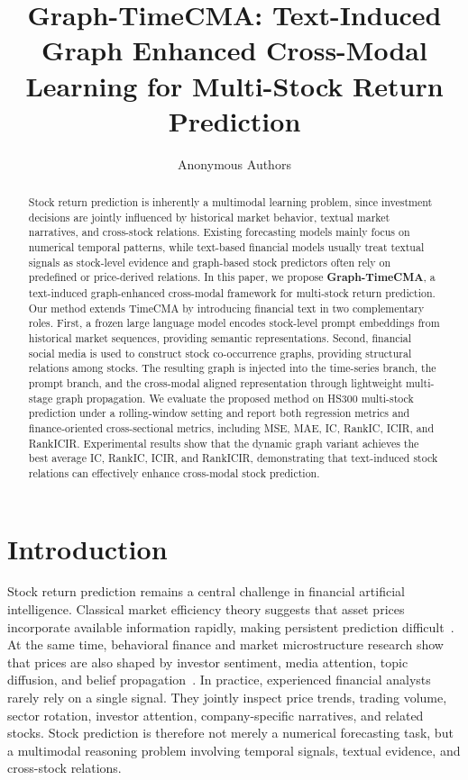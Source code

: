 \documentclass[runningheads]{llncs}
\title{Graph-TimeCMA: Text-Induced Graph Enhanced Cross-Modal Learning for Multi-Stock Return Prediction}
\author{Anonymous Authors}
\institute{Anonymous Institution \\
\email{anonymous@example.com}}
\begin{document}
\maketitle

\begin{abstract}
Stock return prediction is inherently a multimodal learning problem, since investment decisions are jointly influenced by historical market behavior, textual market narratives, and cross-stock relations. Existing forecasting models mainly focus on numerical temporal patterns, while text-based financial models usually treat textual signals as stock-level evidence and graph-based stock predictors often rely on predefined or price-derived relations. In this paper, we propose \textbf{Graph-TimeCMA}, a text-induced graph-enhanced cross-modal framework for multi-stock return prediction. Our method extends TimeCMA by introducing financial text in two complementary roles. First, a frozen large language model encodes stock-level prompt embeddings from historical market sequences, providing semantic representations. Second, financial social media is used to construct stock co-occurrence graphs, providing structural relations among stocks. The resulting graph is injected into the time-series branch, the prompt branch, and the cross-modal aligned representation through lightweight multi-stage graph propagation. We evaluate the proposed method on HS300 multi-stock prediction under a rolling-window setting and report both regression metrics and finance-oriented cross-sectional metrics, including MSE, MAE, IC, RankIC, ICIR, and RankICIR. Experimental results show that the dynamic graph variant achieves the best average IC, RankIC, ICIR, and RankICIR, demonstrating that text-induced stock relations can effectively enhance cross-modal stock prediction.

\end{abstract}

\section{Introduction}

Stock return prediction remains a central challenge in financial artificial intelligence. Classical market efficiency theory suggests that asset prices incorporate available information rapidly, making persistent prediction difficult~\cite{fama1970efficient}. At the same time, behavioral finance and market microstructure research show that prices are also shaped by investor sentiment, media attention, topic diffusion, and belief propagation~\cite{baker2006investor,barber2008all,tetlock2007giving,da2011attention}. In practice, experienced financial analysts rarely rely on a single signal. They jointly inspect price trends, trading volume, sector rotation, investor attention, company-specific narratives, and related stocks. Stock prediction is therefore not merely a numerical forecasting task, but a multimodal reasoning problem involving temporal signals, textual evidence, and cross-stock relations.
\end{document}
